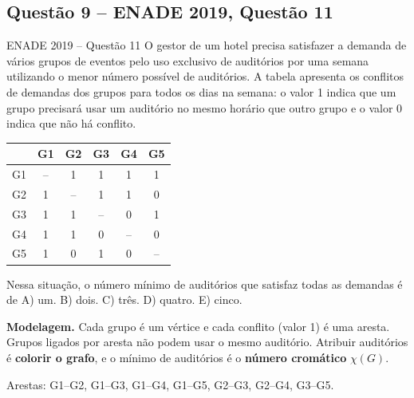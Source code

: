 \documentclass[11pt,a4paper]{article}
\newcommand{\solucao}{\par\medskip\noindent{\large\bfseries\color{verde}Solução}\par\smallskip}
\begin{document}
\subsection{Questão 9 -- ENADE 2019, Questão 11}
\begin{enunciado}{ENADE 2019 -- Questão 11}
O gestor de um hotel precisa satisfazer a demanda de vários grupos de eventos pelo uso exclusivo de
auditórios por uma semana utilizando o menor número possível de auditórios. A tabela apresenta os
conflitos de demandas dos grupos para todos os dias na semana: o valor 1 indica que um grupo precisará
usar um auditório no mesmo horário que outro grupo e o valor 0 indica que não há conflito.
\begin{center}
\begin{tabular}{c|ccccc}
   & G1 & G2 & G3 & G4 & G5\\\hline
G1 & -- & 1 & 1 & 1 & 1\\
G2 & 1 & -- & 1 & 1 & 0\\
G3 & 1 & 1 & -- & 0 & 1\\
G4 & 1 & 1 & 0 & -- & 0\\
G5 & 1 & 0 & 1 & 0 & --
\end{tabular}
\end{center}
Nessa situação, o número mínimo de auditórios que satisfaz todas as demandas é de\quad
A) um. \quad B) dois. \quad C) três. \quad D) quatro. \quad E) cinco.
\end{enunciado}

\solucao
\textbf{Modelagem.} Cada grupo é um vértice e cada conflito (valor 1) é uma aresta. Grupos ligados por
aresta não podem usar o mesmo auditório. Atribuir auditórios é \textbf{colorir o grafo}, e o mínimo de
auditórios é o \textbf{número cromático} $\chi(G)$.

Arestas: G1--G2, G1--G3, G1--G4, G1--G5, G2--G3, G2--G4, G3--G5.

\begin{center}
\end{center}
\end{document}
